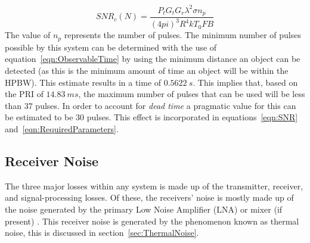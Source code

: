 \documentclass[11pt]{witseiepaper}
\begin{document}
\begin{bibunit}[witseie]
\begin{equation} \label{eqn:MultiplePulses}
SNR_c (N) = \frac{P_{t} G_{t} G_{r} \lambda^2 \sigma n_p}{(4 pi)^3 R^4 k T_0 F B}  
\end{equation}
The value of $n_p$ represents the number of pulses. The minimum number of pulses possible by this system can be determined with the use of equation~\ref{eqn:ObservableTime} by using the minimum distance an object can be detected (as this is the minimum amount of time an object will be within the HPBW). This estimate results in a time of $0.5622~s$. This implies that, based on the PRI of $14.83~ms$, the maximum number of pulses that can be used will be less than $37$ pulses.
In order to account for \textit{dead time} a pragmatic value for this can be estimated to be $30$ pulses. This effect is incorporated in equations~\ref{eqn:SNR} and~\ref{eqn:RequiredParameters}.

\subsection{Receiver Noise} \label{sec:ReceiverNoise}
The three major losses within any system is made up of the transmitter, receiver, and signal-processing losses.
Of these, the receivers' noise is mostly made up of the noise generated by the primary Low Noise Amplifier (LNA) or mixer (if present) \cite[p.~405]{radarHandbook}.
This receiver noise is generated by the phenomenon known as thermal noise, this is discussed in section~\ref{sec:ThermalNoise}.


\end{bibunit}
\end{document}
